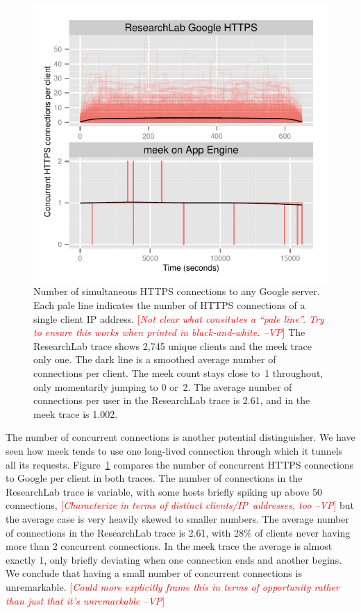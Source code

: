 \documentclass{sig-alternate}
\newcommand{\meek}{meek\xspace}
\newcommand{\lbl}{ResearchLab\xspace}
\newcommand{\note}[1]{{\textcolor{red}{[\textit{#1}]}}}
\newcommand{\vp}[1]{\note{#1 --VP}}
\begin{document}
\begin{figure}
\centering
\includegraphics[width=\linewidth]{concurrent.pdf}
\caption{
Number of simultaneous HTTPS connections to any Google server.
Each pale line indicates the number of HTTPS connections
of a single client IP address.
\vp{Not clear what consitutes a ``pale line''.  Try to ensure this
works when printed in black-and-white.}
The \lbl trace shows 2,745 unique clients and the \meek trace only one.
The dark line is a smoothed average number of connections per client.
The \meek count stays close to~1 throughout, only momentarily
jumping to 0 or~2.
The average number of connections per user in the \lbl trace is 2.61,
and in the \meek trace is 1.002.
}
\label{fig:concurrent}
\end{figure}

The number of concurrent connections is another potential distinguisher.
We have seen how \meek tends to use one long-lived connection
through which it tunnels all its requests.
Figure~\ref{fig:concurrent} compares the number of concurrent HTTPS connections to
Google per client in both traces.
The number of connections in the \lbl trace is variable,
with some hosts briefly spiking up above 50 connections,
\vp{Characterize in terms of distinct clients/IP~addresses, too}
but the average case is very heavily skewed to smaller numbers.
The average number of connections in the \lbl trace is 2.61,
with 28\% of clients never having more than 2 concurrent connections.
In the \meek trace the average is almost exactly 1, only briefly
deviating when one connection ends and another begins.
We conclude that having a small number of concurrent connections is unremarkable.
\vp{Could more explicitly frame this in terms of opportunity rather than
just that it's unremarkable}
\end{document}
